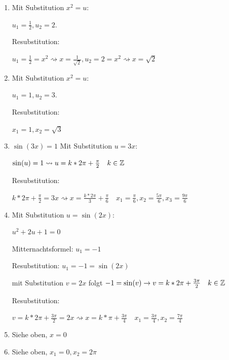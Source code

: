 \begin{lsg}{}
	\begin{enumerate}
    \item Mit Substitution $x^2=u$:

		$u_1=\frac 1 2, u_2=2$.

		Resubstitution:

		$u_1=\frac 1 2 = x^2 \rightsquigarrow x=\frac 1{\sqrt 2},  u_2=2 = x^2 \rightsquigarrow x=\sqrt 2$
    \item Mit Substitution $x^2=u$:

		$u_1=1, u_2=3$.

		Resubstitution:

		$x_1=1, x_2=\sqrt 3$
    \item $\sin(3x) = 1$
		Mit Substitution $u=3x$:

		$\sin(u)=1 \rightsquigarrow u=k*2\pi+\frac {\pi} 2 \quad k\in\mathbb{Z}$

		Resubstitution:

		$k*2\pi+\frac {\pi} 2 = 3x \rightsquigarrow x=\frac {k*2\pi} 3+\frac {\pi} 6\quad x_1=\frac \pi 6, x_2=\frac {5\pi} 6, x_3=\frac{9\pi} 6$
    \item Mit Substitution $u=\sin(2x)$:

		$u^2 + 2u + 1 = 0$

		Mitternachtsformel: $u_1=-1$

		Resubstitution: $u_1=-1=\sin(2x)$

		mit Substitution $v=2x$ folgt $-1=\sin(v) \rightarrow v=k*2\pi+\frac {3\pi} 2 \quad k\in\mathbb{Z}$

		Resubstitution:

		$v=k*2\pi+\frac {3\pi} 2=2x \rightsquigarrow x=k*\pi+\frac {3\pi} 4 \quad x_1=\frac {3\pi} 4, x_2=\frac {7\pi} 4$
    \item Siehe oben, $x=0$
		\item Siehe oben, $x_1=0,x_2=2\pi$
  \end{enumerate}
\end{lsg}


